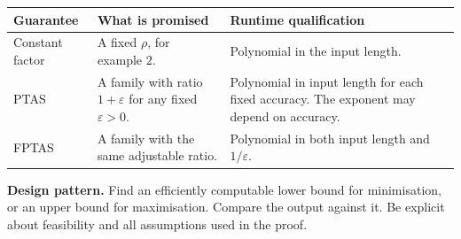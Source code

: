 \documentclass[12pt,a4paper]{article}
\begin{document}
\par\vspace{5pt}
\begingroup
\setlength{\extrarowheight}{1pt}
\noindent\begin{tabularx}{\linewidth}{|B{3.5cm}|Y|Y|}
\hline
\textbf{Guarantee} & \textbf{What is promised} & \textbf{Runtime qualification} \\ \hline
Constant factor & A fixed $\rho$, for example $2$. & Polynomial in the input length. \\ \hline
PTAS & A family with ratio $1+\varepsilon$ for any fixed $\varepsilon>0$. & Polynomial in input length for each fixed accuracy. The exponent may depend on accuracy. \\ \hline
FPTAS & A family with the same adjustable ratio. & Polynomial in both input length and $1/\varepsilon$. \\ \hline
\end{tabularx}\par
\endgroup
\textbf{Design pattern.} Find an efficiently computable lower bound for minimisation, or an upper bound for maximisation. Compare the output against it. Be explicit about feasibility and all assumptions used in the proof.
\end{document}
